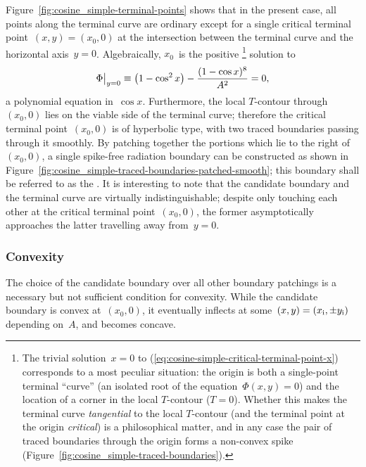 Figure~\ref{fig:cosine_simple-terminal-points} shows that in the present case,
all points along the terminal curve are ordinary
except for a single critical terminal point~$(x, y) = (x_0, 0)$
at the intersection between the terminal curve
and the horizontal axis~$y = 0$.
Algebraically, $x_0$~is the positive%
\footnote{
  The trivial solution~$x = 0$
  to (\ref{eq:cosine-simple-critical-terminal-point-x})
  corresponds to a most peculiar situation:
  the origin is both a single-point terminal ``curve''
  (an isolated root of the equation~$\Phi (x, y) = 0$)
  and the location of a corner in the local $T$-contour ($T = 0$).
  Whether this makes the terminal curve
  \emph{tangential} to the local $T$-contour
  (and the terminal point at the origin \emph{critical})
  is a philosophical matter, and in any case
  the pair of traced boundaries through the origin
  forms a non-convex spike (Figure~\ref{fig:cosine_simple-traced-boundaries}).
}
solution to
\begin{equation}
  \eval[\big]{\Phi}_{y=0}
  \ideq \roundbr*{1 - \cos^2 x} - \frac{(1 - \cos x)^8}{A^2}
  = 0,
  \label{eq:cosine-simple-critical-terminal-point-x}
\end{equation}
a polynomial equation in~$\cos x$.
Furthermore, the local $T$-contour through~$(x_0, 0)$
lies on the viable side of the terminal curve;
therefore the critical terminal point~$(x_0, 0)$ is of hyperbolic type,
with two traced boundaries passing through it smoothly.
By patching together the portions which lie to the right of~$(x_0, 0)$,
a single spike-free radiation boundary can be constructed
as shown in Figure~\ref{fig:cosine_simple-traced-boundaries-patched-smooth};
this boundary shall be referred to as the .
It is interesting to note that
the candidate boundary and the terminal curve are virtually indistinguishable;
despite only touching each other at the critical terminal point~$(x_0, 0)$,
the former asymptotically approaches the latter travelling away from~$y = 0$.

\subsubsection{Convexity}
\label{sec:cartesian.cosine.simple.convexity}

The choice of the candidate boundary over all other boundary patchings
is a necessary but not sufficient condition for convexity.
While the candidate boundary is convex at~$(x_0, 0)$,
it eventually inflects
at some~$(x, y) = (x_{\mathrm{i}}, \pm y_{\mathrm{i}})$ depending on~$A$,
and becomes concave.

